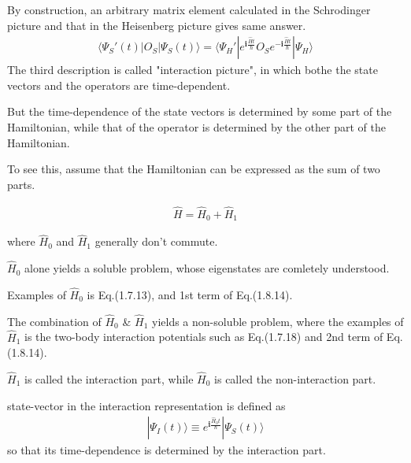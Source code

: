  By construction, an arbitrary matrix element calculated in the Schrodinger picture and that in the Heisenberg picture gives same answer.
\begin{align}
\langle\Psi_S'(t)|O_S|\Psi_S(t)\rangle=\langle\Psi_H'|e^{\bm{i}  \frac{\hat Ht}{\hbar}}O_Se^{-\bm{i}  \frac{\hat Ht}{\hbar}}|\Psi_H\rangle \nonumber
\end{align}
 The third description is called "interaction picture", in which bothe the state vectors and the operators are time-dependent.

 But the time-dependence of the state vectors is determined by some part of the Hamiltonian, while that of the operator is determined by the other part of the Hamiltonian.

 To see this, assume  that the Hamiltonian can be expressed as the sum of two parts.

\begin{align}
\hat H=\hat H_0+\hat H_1 \nonumber
\end{align}

  where $\hat H_0$ and $\hat H_1$ generally don't commute.

 $\hat H_0$ alone yields a soluble problem, whose eigenstates are comletely understood.

 Examples of $\hat H_0$ is Eq.(1.7.13), and 1st term of Eq.(1.8.14).

 The combination of $\hat H_0$ \& $\hat H_1$ yields a non-soluble problem, where the examples of $\hat H_1$ is the two-body interaction potentials such as Eq.(1.7.18) and 2nd term of Eq.(1.8.14).

 $\hat H_1$ is called the interaction part, while $\hat H_0$ is called the non-interaction part.

 state-vector in the interaction representation is defined as
\begin{align}
|\Psi_I(t)\rangle \equiv e^{\bm{i}  \frac{\hat H_0t}{\hbar}}|\Psi_S(t)\rangle
\end{align}
so that its time-dependence is determined by the interaction part.

